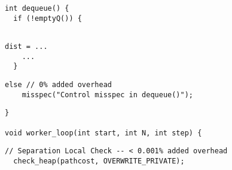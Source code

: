 

\begin{lstlisting}[morekeywords={pathcost,dist}, belowskip=0pt,
firstnumber=10, name=dij_checks, showlines=true]
int dequeue() {
  if (!emptyQ()) {


\end{lstlisting}

\begin{lstlisting}[morekeywords={pathcost,dist}, aboveskip=0pt, belowskip=0pt,
firstnumber=13, name=dij_checks]
    dist = ...
    ...
  }
\end{lstlisting}

  \begin{lstlisting}[morekeywords={pathcost}, aboveskip=0pt,belowskip=0pt,backgroundcolor=\color{lightgray}, firstnumber=auto, name=dij_checks]
  else // 0% added overhead
    misspec("Control misspec in dequeue()");
\end{lstlisting}

\begin{lstlisting}[morekeywords={pathcost,dist}, aboveskip=0pt, belowskip=0pt,
firstnumber=auto, name=dij_checks,showlines=true]
}

void worker_loop(int start, int N, int step) {

\end{lstlisting}

  \begin{lstlisting}[morekeywords={pathcost}, aboveskip=0pt,belowskip=0pt,backgroundcolor=\color{lightgray},
  firstnumber=auto, name=dij_checks,showlines=true]
  // Separation Local Check -- < 0.001% added overhead
  check_heap(pathcost, OVERWRITE_PRIVATE);
  \end{lstlisting}

